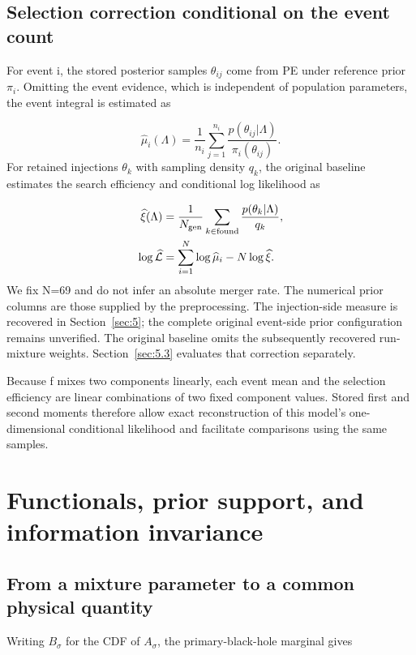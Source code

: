 \documentclass[a4paper,11pt]{article}
\begin{document}
\subsection{Selection correction conditional on the event count}\label{sec:3.2}
For event i, the stored posterior samples \(\theta_{ij}\) come from PE under reference prior \(\pi_{i}\). Omitting the event evidence, which is independent of population parameters, the event integral is estimated as

\begin{equation}\label{eq:3}
\widehat{\mu}_i(\Lambda)=\frac{1}{n_i}\sum_{j=1}^{n_i}\frac{p(\theta_{ij}|\Lambda)}{\pi_i(\theta_{ij})}.
\end{equation}
For retained injections \(\theta_{k}\) with sampling density \(q_{k}\), the original baseline estimates the search efficiency and conditional log likelihood as

\begin{equation}\label{eq:4}
\begin{aligned}\widehat{\xi}(\Lambda)&=\frac{1}{N_{\rm gen}}\sum_{k\in{\rm found}}\frac{p(\theta_k|\Lambda)}{q_k},\\\log\widehat{\mathcal L}&=\sum_{i=1}^{N}\log\widehat{\mu}_i-N\log\widehat{\xi}.\end{aligned}
\end{equation}
We fix N=69 and do not infer an absolute merger rate. The numerical prior columns are those supplied by the preprocessing. The injection-side measure is recovered in Section~\ref{sec:5}; the complete original event-side prior configuration remains unverified. The original baseline omits the subsequently recovered run-mixture weights. Section~\ref{sec:5.3} evaluates that correction separately.

Because f mixes two components linearly, each event mean and the selection efficiency are linear combinations of two fixed component values. Stored first and second moments therefore allow exact reconstruction of this model's one-dimensional conditional likelihood and facilitate comparisons using the same samples.

\FloatBarrier
\section{Functionals, prior support, and information invariance}\label{sec:4}
\subsection{From a mixture parameter to a common physical quantity}\label{sec:4.1}
Writing \(B_\sigma\) for the CDF of \(A_\sigma\), the primary-black-hole marginal gives
\end{document}
